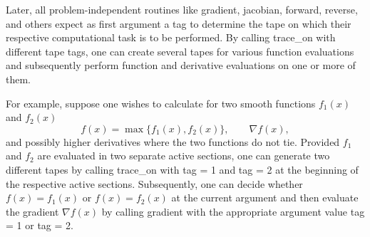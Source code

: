 \documentclass[11pt,twoside]{article}
\begin{document}
 Later, all problem-independent routines
like {\sf gradient}, {\sf jacobian}, {\sf forward}, {\sf reverse}, and others
expect as first argument a {\sf tag} to determine
the tape on which their respective computational task is to be performed.
By calling {\sf trace\_on} with different tape {\sf tag}s, one can create
several tapes for various function evaluations and subsequently perform
function and derivative evaluations on one or more of them. 

For example, suppose one wishes to calculate for two smooth functions 
$f_1(x)$ and $f_2(x)$ 
\[
   f(x) = \max \{f_1(x) ,f_2(x)\},\qquad \nabla f(x),
\]
and possibly higher derivatives where the two functions do not tie.
Provided $f_1$ and $f_2$ are evaluated in two separate active sections,
one can generate two different tapes by calling {\sf trace\_on} with
{\sf tag} = 1 and {\sf tag} = 2 at the beginning of the respective active
sections.
Subsequently, one can decide whether $f(x)=f_1(x)$ or $f(x)=f_2(x)$ at the 
current argument and then evaluate the gradient $\nabla f(x)$ by calling
{\sf gradient} with the appropriate argument value {\sf tag} = 1 or
{\sf tag} = 2. 
%
\end{document}
